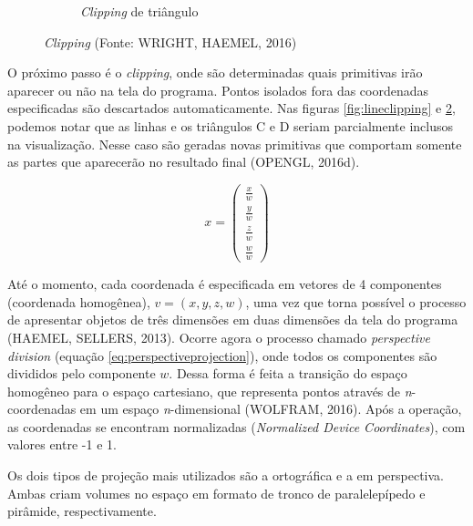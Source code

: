 \begin{figure}[H]
\begin{subfigure}[b]{0.4\textwidth}
		\caption[Clipping de triângulo]{\textit{Clipping} de triângulo}
		\label{fig:triangleclipping}
	\end{subfigure}
	\caption[\textit{Clipping}]{\textit{Clipping} (Fonte: WRIGHT, HAEMEL, 2016)}
\end{figure}
	
O próximo passo é o \textit{clipping}, onde são determinadas quais primitivas irão aparecer ou não na tela do programa. Pontos isolados fora das coordenadas especificadas são descartados automaticamente. Nas figuras \ref{fig:lineclipping} e \ref{fig:triangleclipping}, podemos notar que as linhas e os triângulos C e D seriam parcialmente inclusos na visualização. Nesse caso são geradas novas primitivas que comportam somente as partes que aparecerão no resultado final (OPENGL, 2016d).

\begin{equation}
x = 
\begin{pmatrix} 
\frac{x}{w} \\
\frac{y}{w} \\
\frac{z}{w} \\
\frac{w}{w}
\end{pmatrix}
\label{eq:perspectiveprojection}
\end{equation}

Até o momento, cada coordenada é especificada em vetores de 4 componentes (coordenada homogênea), $v = (x, y, z, w)$, uma vez que torna possível o processo de apresentar objetos de três dimensões em duas dimensões da tela do programa (HAEMEL, SELLERS, 2013). Ocorre agora o processo chamado \textit{perspective division} (equação \ref{eq:perspectiveprojection}), onde todos os componentes são divididos pelo componente $w$. Dessa forma é feita a transição do espaço homogêneo para o espaço cartesiano, que representa pontos através de \textit{n}-coordenadas em um espaço \textit{n}-dimensional (WOLFRAM, 2016). Após a operação, as coordenadas se encontram normalizadas (\textit{Normalized Device Coordinates}), com valores entre -1 e 1.


Os dois tipos de projeção mais utilizados são a ortográfica e a em perspectiva. Ambas criam volumes no espaço em formato de tronco de paralelepípedo e pirâmide, respectivamente. 

